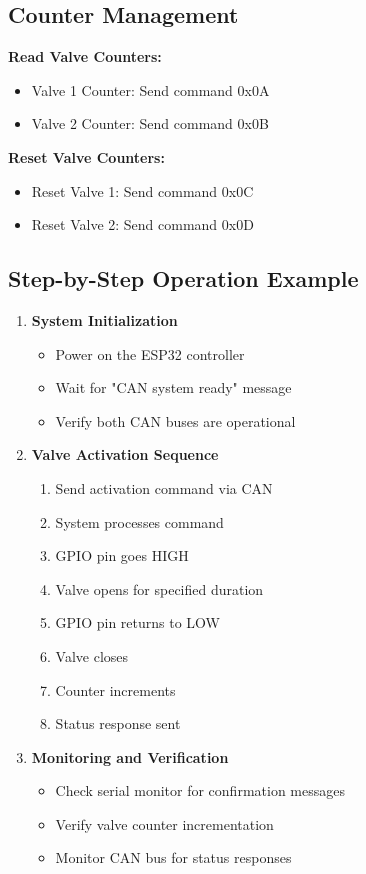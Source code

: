 \documentclass[11pt,a4paper]{article}
\begin{document}
\subsection{Counter Management}

\textbf{Read Valve Counters:}
\begin{itemize}
    \item Valve 1 Counter: Send command 0x0A
    \item Valve 2 Counter: Send command 0x0B
\end{itemize}

\textbf{Reset Valve Counters:}
\begin{itemize}
    \item Reset Valve 1: Send command 0x0C
    \item Reset Valve 2: Send command 0x0D
\end{itemize}

\subsection{Step-by-Step Operation Example}

\begin{enumerate}
    \item \textbf{System Initialization}
    \begin{itemize}
        \item Power on the ESP32 controller
        \item Wait for "CAN system ready" message
        \item Verify both CAN buses are operational
    \end{itemize}
    
    \item \textbf{Valve Activation Sequence}
    \begin{enumerate}
        \item Send activation command via CAN
        \item System processes command
        \item GPIO pin goes HIGH
        \item Valve opens for specified duration
        \item GPIO pin returns to LOW
        \item Valve closes
        \item Counter increments
        \item Status response sent
    \end{enumerate}
    
    \item \textbf{Monitoring and Verification}
    \begin{itemize}
        \item Check serial monitor for confirmation messages
        \item Verify valve counter incrementation
        \item Monitor CAN bus for status responses
    \end{itemize}
\end{enumerate}
\end{document}
